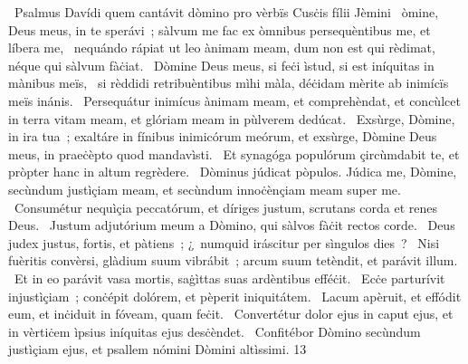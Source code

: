 {~Psalmus Davídi quem cantávit dòmino pro vèrbïs Cusċis fílii Jèmini}
{%
~òmine, Deus meus, in te sperávi~; sàlvum me fac ex òmnibus persequèntibus me, et líbera me,
~nequándo rápiat ut leo ànimam meam, dum non est qui rèdimat, néque qui sàlvum fàċiat.
~Dòmine Deus meus, si feċi ìstud, si est iníquitas in mànibus meïs,
~si rèddidi retribuèntibus mìhi màla, déċidam mèrite ab inimícïs meïs inánis.
~Persequátur inimícus ànimam meam, et comprehèndat, et concùlcet in terra vitam meam, et glóriam meam in pùlverem dedúcat.
~Exsùrge, Dòmine, in ira tua~; exaltáre in fínibus inimicórum meórum, et exsùrge, Dòmine Deus meus, in praeċèpto quod mandavìsti.
~Et synagóga populórum çircùmdabit te, et pròpter hanc in altum regrèdere.
~Dòminus júdicat pòpulos. Júdica me, Dòmine, secùndum justìçiam meam, et secùndum innoċènçiam meam super me.
~Consumétur nequìçia peccatórum, et díriges justum, scrutans corda et renes Deus.
~Justum adjutórium meum a Dòmino, qui sàlvos fàċit rectos corde.
~Deus judex justus, fortis, et pàtiens~; ¿~numquid iráscitur per sìngulos dies~?
~Nisi fuèritis convèrsi, glàdium suum vibrábit~; arcum suum tetèndit, et parávit illum.
~Et in eo parávit vasa mortis, saġìttas suas ardèntibus efféċit.
~Ecċe parturívit injustìçiam~; conċépit dolórem, et pèperit iniquitátem.
~Lacum apèruit, et effódit eum, et inċiduit in fóveam, quam feċit.
~Convertétur dolor ejus in caput ejus, et in vèrtiċem ìpsius iníquitas ejus desċèndet.
~Confitébor Dòmino secùndum justìçiam ejus, et psallem nómini Dòmini altìssimi.
}
{1}{3}
